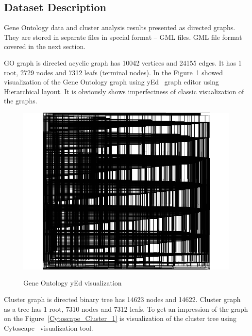 \documentclass[a4paper,oneside]{article}
\begin{document}
\subsection{Dataset Description}
\label{dataset_description}
Gene Ontology data and cluster analysis results presented as directed graphs. They are stored in separate files in special format -- GML files. GML file format covered in the next section.


GO graph is directed acyclic graph has 10042 vertices and  24155 edges. It has 1 root, 2729 nodes and 7312 leafs (terminal nodes). In the Figure~\ref{yEd_GO} showed visualization of the Gene Ontology graph using yEd~\cite{yed} graph editor using Hierarchical layout. It is obviously shows imperfectness of classic visualization of the graphs.


\begin{figure}[h]
\begin{center}
	\includegraphics[scale=0.3]{yEd_GO.png}
	\label{yEd_GO}
	\caption{Gene Ontology yEd visualization}
\end{center}
\end{figure}


Cluster graph is directed binary  tree has 14623 nodes and 14622. Cluster graph as a tree has 1 root, 7310 nodes and 7312 leafs. To get an impression of the graph on the Figure~\ref{Cytoscape_Cluster_1} is visualization of the cluster tree using Cytoscape~\cite{Cytoscape} visualization tool.
\end{document}
